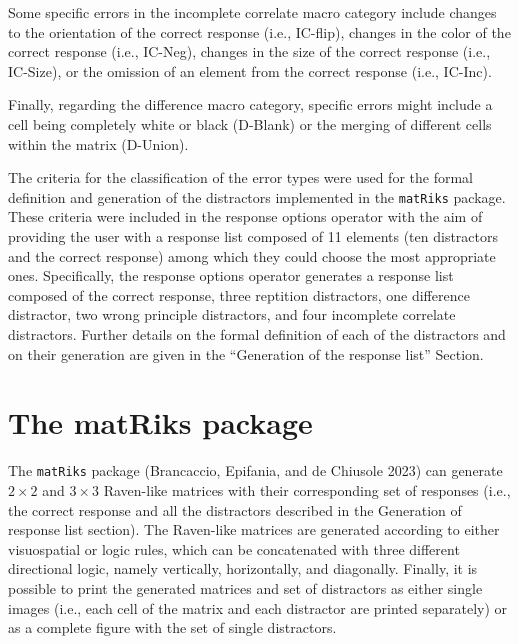 \documentclass[
]{article}
\begin{document}
Some specific errors in the incomplete correlate macro category include
changes to the orientation of the correct response (i.e., IC-flip),
changes in the color of the correct response (i.e., IC-Neg), changes in
the size of the correct response (i.e., IC-Size), or the omission of an
element from the correct response (i.e., IC-Inc).

Finally, regarding the difference macro category, specific errors might
include a cell being completely white or black (D-Blank) or the merging
of different cells within the matrix (D-Union).

The criteria for the classification of the error types were used for the
formal definition and generation of the distractors implemented in the
\texttt{matRiks} package. These criteria were included in the response
options operator with the aim of providing the user with a response list
composed of 11 elements (ten distractors and the correct response) among
which they could choose the most appropriate ones. Specifically, the
response options operator generates a response list composed of the
correct response, three reptition distractors, one difference
distractor, two wrong principle distractors, and four incomplete
correlate distractors. Further details on the formal definition of each
of the distractors and on their generation are given in the ``Generation
of the response list'' Section.

\section{The matRiks package}\label{the-matriks-package}

The \texttt{matRiks} package (Brancaccio, Epifania, and de Chiusole
2023) can generate \(2 \times 2\) and \(3 \times 3\) Raven-like matrices
with their corresponding set of responses (i.e., the correct response
and all the distractors described in the Generation of response list
section). The Raven-like matrices are generated according to either
visuospatial or logic rules, which can be concatenated with three
different directional logic, namely vertically, horizontally, and
diagonally. Finally, it is possible to print the generated matrices and
set of distractors as either single images (i.e., each cell of the
matrix and each distractor are printed separately) or as a complete
figure with the set of single distractors.
\end{document}
